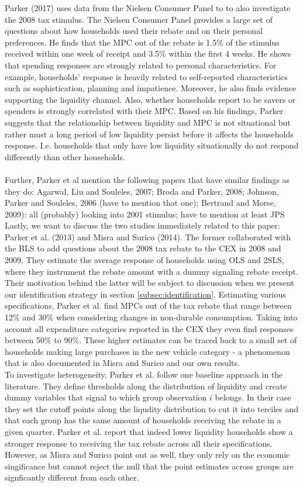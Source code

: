 Parker (2017) uses data from the Nielsen Consumer Panel to to also investigate the 2008 tax stimulus. The Nielsen Consumer Panel provides a large set of questions about how households used their rebate and on their personal preferences. He finds that the MPC out of the rebate is 1.5\% of the stimulus received within one week of receipt and 3.5\% within the first 4 weeks. He shows that spending responses are strongly related to personal characteristics. For example, households' response is heavily related to self-reported characteristics such as sophistication, planning and impatience. Moreover, he also finds evidence supporting the liquidity channel. Also, whether households report to be savers or spenders is strongly correlated with their MPC. Based on his findings, Parker suggests that the relationship between liquidity and MPC is not situational but rather must a long period of low liquidity persist before it affects the households response. I.e. households that only have low liquidity situationally do not respond differently than other households. \\
\\
Further, Parker et al mention the following papers that have similar findings as they do: Agarwal, Liu and Souleles, 2007; Broda and Parker, 2008; Johnson, Parker and Souleles, 2006 (have to mention that one); Bertrand and Morse, 2009): all (probably) looking into 2001 stimulus; have to mention at least JPS \\
Lastly, we want to discuss the two studies immediately related to this paper: Parker et al. (2013) and Misra and Surico (2014). The former collaborated with the BLS to add questions about the 2008 tax rebate to the CEX in 2008 and 2009. They estimate the average response of households using OLS and 2SLS, where they instrument the rebate amount with a dummy signaling rebate receipt. Their motivation behind the latter will be subject to discussion when we present our identification strategy in section \ref{subsec:identification}. Estimating various specifications, Parker et al. find MPCs out of the tax rebate that range between 12\% and 30\% when considering changes in non-durable consumption. Taking into account all expenditure categories reported in the CEX they even find responses between 50\% to 90\%. These higher estimates can be traced back to a small set of households making large purchases in the new vehicle category - a phenomenon that is also documented in Misra and Surico and our own results. \\
To investigate heterogeneity, Parker et al. follow one baseline approach in the literature. They define thresholds along the distribution of liquidity and create dummy variables that signal to which group observation $i$ belongs. In their case they set the cutoff points along the liqudity distribution to cut it into terciles and that each group has the same amount of households receiving the rebate in a given quarter. Parker et al. report that indeed lower liquidity households show a stronger response to receiving the tax rebate across all their specifications. However, as Misra and Surico point out as well, they only rely on the economic singificance but cannot reject the null that the point estimates across groups are signficantly different from each other. \\
